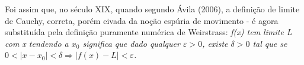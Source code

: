 Foi assim que, no século XIX, quando segundo Ávila (2006), a
definição de limite de Cauchy, correta, porém eivada da noção
espúria de movimento - é agora substituída pela definição puramente
numérica de Weirstrass: \emph{f(x) tem limite L com x tendendo a
$x_{0}$ significa que dado qualquer $\varepsilon>0$, existe
$\delta>0$ tal que se
$0<|x-x_0|<\delta\Rightarrow|f(x)-L|<\varepsilon$.}
